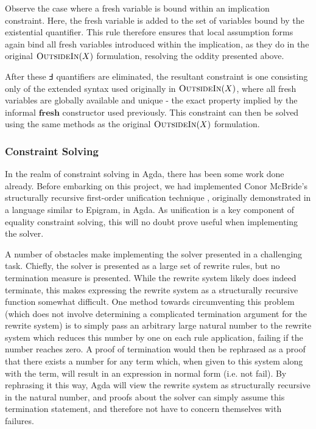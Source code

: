 \documentclass[a4paper]{jfp}
\newcommand{\outsidein}{\textsc{OutsideIn}(X)}
\begin{document}
\medskip

Observe the case where a fresh variable is bound within an implication constraint. Here, the fresh variable is added to the set of variables bound by the existential quantifier. This rule therefore ensures that local assumption forms again bind all fresh variables introduced within the implication, as they do in the original $\outsidein$ formulation, resolving the oddity presented above.

After these $\Finv$ quantifiers are eliminated, the resultant constraint is one consisting only of the extended syntax used originally in $\outsidein$, where all fresh variables are globally available and unique - the exact property implied by the informal $\textbf{fresh}$ constructor used previously. This constraint can then be solved using the same methods as the original $\outsidein$ formulation.



\subsubsection{Constraint Solving}

In the realm of constraint solving in Agda, there has been some work done already. Before embarking on this project, we had implemented Conor McBride's structurally recursive first-order unification technique \cite{McBride:2003bg}, originally demonstrated in a language similar to Epigram, in Agda. As unification is a key component of equality constraint solving, this will no doubt prove useful when implementing the solver.

A number of obstacles make implementing the solver presented in \cite{Vytiniotis:2011:OMT:2139531.2139533} a challenging task. Chiefly, the solver is presented as a large set of rewrite rules, but no termination measure is presented. While the rewrite system likely does indeed terminate, this makes expressing the rewrite system as a structurally recursive function somewhat difficult. One method towards circumventing this problem (which does not involve determining a complicated termination argument for the rewrite system) is to simply pass an arbitrary large natural number to the rewrite system which reduces this number by one on each rule application, failing if the number reaches zero. A proof of termination would then be rephrased as a proof that there exists a number for any term which, when given to this system along with the term, will result in an expression in normal form (i.e. not fail). By rephrasing it this way, Agda will view the rewrite system as structurally recursive in the natural number, and proofs about the solver can simply assume this termination statement, and therefore not have to concern themselves with failures.
\end{document}
